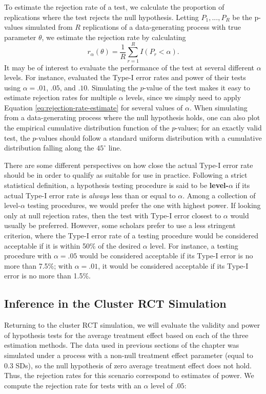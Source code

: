 \documentclass[
]{book}
\begin{document}
To estimate the rejection rate of a test, we calculate the proportion of replications where the test rejects the null hypothesis.
Letting \(P_1,...,P_R\) be the p-values simulated from \(R\) replications of a data-generating process with true parameter \(\theta\), we estimate the rejection rate by calculating
\[
r_\alpha(\theta) = \frac{1}{R} \sum_{r=1}^R I(P_r < \alpha).
\label{eq:rejection-rate-estimate}
\]
It may be of interest to evaluate the performance of the test at several different \(\alpha\) levels.
For instance, \citet{brown1974SmallSampleBehavior} evaluated the Type-I error rates and power of their tests using \(\alpha = .01\), \(.05\), and \(.10\).
Simulating the \(p\)-value of the test makes it easy to estimate rejection rates for multiple \(\alpha\) levels, since we simply need to apply Equation \eqref{eq:rejection-rate-estimate} for several values of \(\alpha\).
When simulating from a data-generating process where the null hypothesis holds, one can also plot the empirical cumulative distribution function of the \(p\)-values; for an exactly valid test, the \(p\)-values should follow a standard uniform distribution with a cumulative distribution falling along the \(45^\circ\) line.

There are some different perspectives on how close the actual Type-I error rate should be in order to qualify as suitable for use in practice. Following a strict statistical definition, a hypothesis testing procedure is said to be \textbf{level-\(\alpha\)} if its actual Type-I error rate is \emph{always} less than or equal to \(\alpha\).
Among a collection of level-\(\alpha\) testing procedures, we would prefer the one with highest power.
If looking only at null rejection rates, then the test with Type-I error closest to \(\alpha\) would usually be preferred.
However, some scholars prefer to use a less stringent criterion, where the Type-I error rate of a testing procedure would be considered acceptable if it is within 50\% of the desired \(\alpha\) level.
For instance, a testing procedure with \(\alpha = .05\) would be considered acceptable if its Type-I error is no more than 7.5\%; with \(\alpha = .01\), it would be considered acceptable if its Type-I error is no more than 1.5\%.

\subsection{Inference in the Cluster RCT Simulation}\label{inference-in-the-cluster-rct-simulation}

Returning to the cluster RCT simulation, we will evaluate the validity and power of hypothesis tests for the average treatment effect based on each of the three estimation methods.
The data used in previous sections of the chapter was simulated under a process with a non-null treatment effect parameter (equal to 0.3 SDs), so the null hypothesis of zero average treatment effect does not hold.
Thus, the rejection rates for this scenario correspond to estimates of power.
We compute the rejection rate for tests with an \(\alpha\) level of \(.05\):
\end{document}
